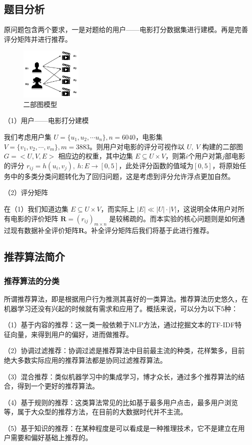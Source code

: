 \subsection{题目分析}
\xiaosi\begin{spacing}{1.5}
原问题包含两个要求，一是对题给的用户——电影打分数据集进行建模。再是完善评分矩阵并进行推荐。\par
\begin{figure}%
\centering
\includegraphics[width=0.27\textwidth]{Figure/simrank-f1.png}
\caption{二部图模型}
\end{figure}
（1）用户——电影打分建模\par
我们考虑用户集 $U=\{u_1,u_2,\cdots u_n\},n=6040$，电影集 $V=\{v_1,v_2,\cdots,v_m\},m=3883$。则用户对电影的评分可视作以 $U,\ V$ 构建的二部图 $G=<U,V,E>$ 相应边的权重，其中边集 $E \subseteq U \times V$，则第$i$个用户对第$j$部电影的评分 $r_{ij}=h(u_i,v_j),\ h:E\rightarrow [0,5]$，此处评分函数的值域为$[0,5]$，将原始任务中的多类分类问题转化为了回归问题，这是考虑到评分允许浮点更加自然。\par
（2）评分矩阵\par
在（1）我们知道边集 $E \subseteq U \times V$，而实际上 $|E|\ll |U|\cdot|V|$，这说明全体用户对所有电影的评价矩阵 $\mathbf{R}=(r_{ij})_{m\times n}$ 是较稀疏的。而本实验的核心问题则是如何通过现有数据补全评价矩阵$\mathbf{R}$。补全评分矩阵后我们将基于此进行推荐。
\end{spacing}

\subsection{推荐算法简介}
\subsubsection{推荐算法的分类}
\xiaosi\begin{spacing}{1.5}
所谓推荐算法，即是根据用户行为推测其喜好的一类算法。推荐算法历史悠久，在机器学习还没有兴起的时候就有需求和应用了。概括来说，可以分为以下5种\cite{1}：\par
（1）基于内容的推荐：这一类一般依赖于NLP方法，通过挖掘文本的TF-IDF特征向量，来得到用户的偏好，进而做推荐。\par
（2）协调过滤推荐：协调过滤是推荐算法中目前最主流的种类，花样繁多，目前绝大多数实际应用的推荐算法都是协同过滤推荐算法。\par
（3）混合推荐：类似机器学习中的集成学习，博才众长，通过多个推荐算法的结合，得到一个更好的推荐算法。\par
（4）基于规则的推荐：这类算法常见的比如基于最多用户点击，最多用户浏览等，属于大众型的推荐方法，在目前的大数据时代并不主流。\par
（5）基于知识的推荐：在某种程度是可以看成是一种推理技术，它不是建立在用户需要和偏好基础上推荐的。\par
\end{spacing}
